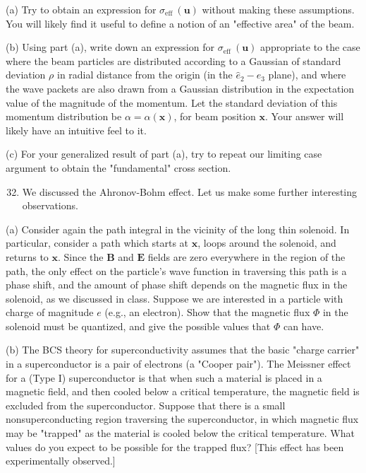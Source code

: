\documentclass[12pt]{article}
\begin{document}
(a) Try to obtain an expression for $\sigma_{\text {eff }}(\mathbf{u})$ without making these assumptions. You will likely find it useful to define a notion of an "effective area" of the beam.

(b) Using part (a), write down an expression for $\sigma_{\text {eff }}(\mathbf{u})$ appropriate to the case where the beam particles are distributed according to a Gaussian of standard deviation $\rho$ in radial distance from the origin (in the $\hat{e}_{2}-\hat{e}_{3}$ plane), and where the wave packets are also drawn from a Gaussian distribution in the expectation value of the magnitude of the momentum. Let the standard deviation of this momentum distribution be $\alpha=\alpha(\mathbf{x})$, for beam position $\mathbf{x}$. Your answer will likely have an intuitive feel to it.

(c) For your generalized result of part (a), try to repeat our limiting case argument to obtain the "fundamental" cross section.

\begin{enumerate}
  \setcounter{enumi}{31}
  \item We discussed the Ahronov-Bohm effect. Let us make some further interesting observations.
\end{enumerate}

(a) Consider again the path integral in the vicinity of the long thin solenoid. In particular, consider a path which starts at $\boldsymbol{x}$, loops around the solenoid, and returns to $\boldsymbol{x}$. Since the $\boldsymbol{B}$ and $\boldsymbol{E}$ fields are zero everywhere in the region of the path, the only effect on the particle's wave function in traversing this path is a phase shift, and the amount of phase shift depends on the magnetic flux in the solenoid, as we discussed in class. Suppose we are interested in a particle with charge of magnitude $e$ (e.g., an electron). Show that the magnetic flux $\Phi$ in the solenoid must be quantized, and give the possible values that $\Phi$ can have.

(b) The BCS theory for superconductivity assumes that the basic "charge carrier" in a superconductor is a pair of electrons (a "Cooper pair"). The Meissner effect for a (Type I) superconductor is that when such a material is placed in a magnetic field, and then cooled below a critical temperature, the magnetic field is excluded from the superconductor. Suppose that there is a small nonsuperconducting region traversing the superconductor, in which magnetic flux may be "trapped" as the material is cooled below the critical temperature. What values do you expect to be possible for the trapped flux? [This effect has been experimentally observed.]
\end{document}
